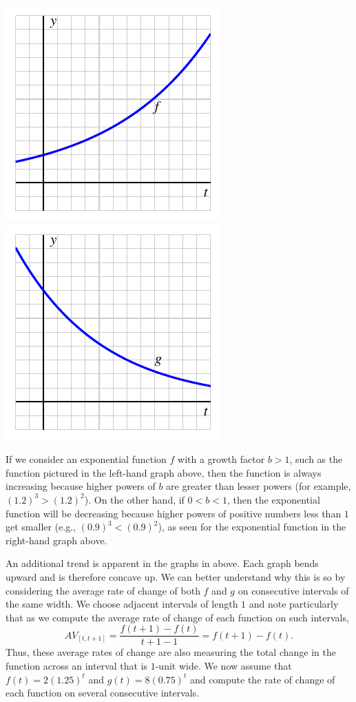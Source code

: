 \documentclass[nooutcomes]{ximera}
\begin{document}
\begin{image}
\includegraphics{growth-incr-CCU.pdf}
\includegraphics{growth-decr-CCU.pdf}
\end{image}

If we consider an exponential function $f$ with a growth factor $b > 1$, such as the function pictured in the left-hand graph above, then the function is always increasing because higher powers of $b$ are greater than lesser powers (for example, $(1.2)^3 \gt (1.2)^2$).  On the other hand, if $0 \lt b \lt 1$, then the exponential function will be decreasing because higher powers of positive numbers less than $1$ get smaller (e.g., $(0.9)^3 \lt (0.9)^2$), as seen for the exponential function in the right-hand graph above.

An additional trend is apparent in the graphs in above.  Each graph bends upward and is therefore concave up.  We can better understand why this is so by considering the average rate of change of both $f$ and $g$ on consecutive intervals of the same width.  We choose adjacent intervals of length $1$ and note particularly that as we compute the average rate of change of each function on such intervals,%
\begin{equation*}
AV_{[t,t+1]} = \frac{f(t+1) - f(t)}{t+1-1} = f(t+1) - f(t)\text{.}
\end{equation*}
Thus, these average rates of change are also measuring the total change in the function across an interval that is $1$-unit wide. We now assume that $f(t) = 2 (1.25)^t$ and $g(t) = 8(0.75)^t$ and compute the rate of change of each function on several consecutive intervals.
\end{document}
